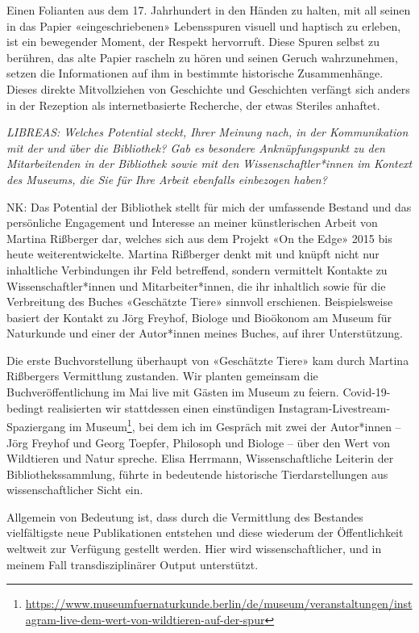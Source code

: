 \documentclass[a4paper,
fontsize=11pt,
oneside,
numbers=noperiodatend,
parskip=half-,
bibliography=totoc,
final
]{scrartcl}
\begin{document}
Einen Folianten aus dem 17. Jahrhundert in den Händen zu halten, mit all
seinen in das Papier «eingeschriebenen» Lebensspuren visuell und
haptisch zu erleben, ist ein bewegender Moment, der Respekt hervorruft.
Diese Spuren selbst zu berühren, das alte Papier rascheln zu hören und
seinen Geruch wahrzunehmen, setzen die Informationen auf ihm in
bestimmte historische Zusammenhänge. Dieses direkte Mitvollziehen von
Geschichte und Geschichten verfängt sich anders in der Rezeption als
internetbasierte Recherche, der etwas Steriles anhaftet.

\emph{LIBREAS: Welches Potential steckt, Ihrer Meinung nach, in der
Kommunikation mit der und über die Bibliothek? Gab es besondere
Anknüpfungspunkt zu den Mitarbeitenden in der Bibliothek sowie mit den
Wissenschaftler*innen im Kontext des Museums, die Sie für Ihre Arbeit
ebenfalls einbezogen haben?}

NK: Das Potential der Bibliothek stellt für mich der umfassende Bestand
und das persönliche Engagement und Interesse an meiner künstlerischen
Arbeit von Martina Rißberger dar, welches sich aus dem Projekt «On the
Edge» 2015 bis heute weiterentwickelte. Martina Rißberger denkt mit und
knüpft nicht nur inhaltliche Verbindungen ihr Feld betreffend, sondern
vermittelt Kontakte zu Wissenschaftler*innen und Mitarbeiter*innen, die
ihr inhaltlich sowie für die Verbreitung des Buches «Geschätzte Tiere»
sinnvoll erschienen. Beispielsweise basiert der Kontakt zu Jörg Freyhof,
Biologe und Bioökonom am Museum für Naturkunde und einer der Autor*innen
meines Buches, auf ihrer Unterstützung.

Die erste Buchvorstellung überhaupt von «Geschätzte Tiere» kam durch
Martina Rißbergers Vermittlung zustanden. Wir planten gemeinsam die
Buchveröffentlichung im Mai live mit Gästen im Museum zu feiern.
Covid-19-bedingt realisierten wir stattdessen einen einstündigen
Instagram-Livestream-Spaziergang im Museum\footnote{\url{https://www.museumfuernaturkunde.berlin/de/museum/veranstaltungen/instagram-live-dem-wert-von-wildtieren-auf-der-spur}},
bei dem ich im Gespräch mit zwei der Autor*innen -- Jörg Freyhof und
Georg Toepfer, Philosoph und Biologe -- über den Wert von Wildtieren und
Natur spreche. Elisa Herrmann, Wissenschaftliche Leiterin der
Bibliothekssammlung, führte in bedeutende historische Tierdarstellungen
aus wissenschaftlicher Sicht ein.

Allgemein von Bedeutung ist, dass durch die Vermittlung des Bestandes
vielfältigste neue Publikationen entstehen und diese wiederum der
Öffentlichkeit weltweit zur Verfügung gestellt werden. Hier wird
wissenschaftlicher, und in meinem Fall transdisziplinärer Output
unterstützt.
\end{document}
